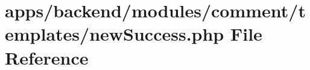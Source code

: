 \hypertarget{backend_2modules_2comment_2templates_2new_success_8php}{\section{apps/backend/modules/comment/templates/new\-Success.php File Reference}
\label{backend_2modules_2comment_2templates_2new_success_8php}
}
